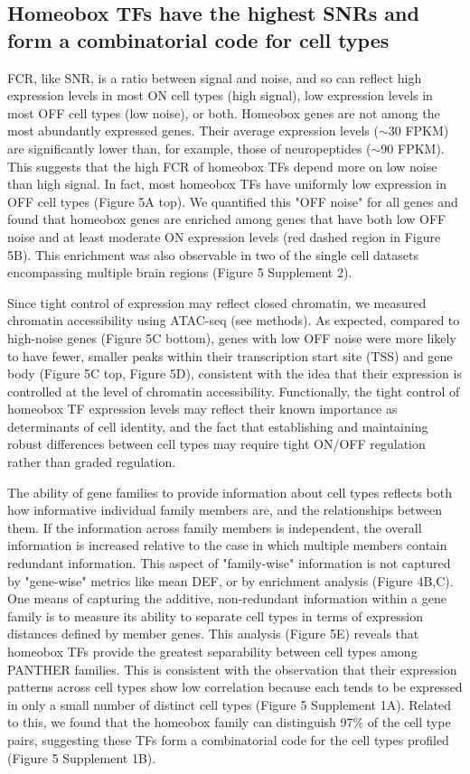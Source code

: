 \subsection{Homeobox TFs have the highest SNRs and form a combinatorial code for cell types}
FCR, like SNR, is a ratio between signal and noise, and so can reflect high expression levels in most ON cell types (high signal), low expression levels in most OFF cell types (low noise), or both. Homeobox genes are not among the most abundantly expressed genes. Their average expression levels ($\sim$30 FPKM) are significantly lower than, for example, those of neuropeptides ($\sim$90 FPKM). This suggests that the high FCR of homeobox TFs depend more on low noise than high signal. In fact, most homeobox TFs have uniformly low expression in OFF cell types (Figure 5A top). We quantified this "OFF noise" for all genes and found that homeobox genes are enriched among genes that have both low OFF noise and at least moderate ON expression levels (red dashed region in Figure 5B). This enrichment was also observable in two of the single cell datasets encompassing multiple brain regions (Figure 5 Supplement 2). 

Since tight control of expression may reflect closed chromatin, we measured chromatin accessibility using ATAC-seq (see methods). As expected, compared to high-noise genes (Figure 5C bottom), genes with low OFF noise were more likely to have fewer, smaller peaks within their transcription start site (TSS) and gene body (Figure 5C top, Figure 5D), consistent with the idea that their expression is controlled at the level of chromatin accessibility. Functionally, the tight control of homeobox TF expression levels may reflect their known importance as determinants of cell identity, and the fact that establishing and maintaining robust differences between cell types may require tight ON/OFF regulation rather than graded regulation.

The ability of gene families to provide information about cell types reflects both how informative individual family members are, and the relationships between them. If the information across family members is independent, the overall information is increased relative to the case in which multiple members contain redundant information. This aspect of "family-wise" information is not captured by "gene-wise" metrics like mean DEF, or by enrichment analysis (Figure 4B,C). One means of capturing the additive, non-redundant information within a gene family is to measure its ability to separate cell types in terms of expression distances defined by member genes. This analysis (Figure 5E) reveals that homeobox TFs provide the greatest separability between cell types among PANTHER families. This is consistent with the observation that their expression patterns across cell types show low correlation because each tends to be expressed in only a small number of distinct cell types (Figure 5 Supplement 1A). Related to this, we found that the homeobox family can distinguish 97\% of the cell type pairs, suggesting these TFs form a combinatorial code for the cell types profiled (Figure 5 Supplement 1B). 


